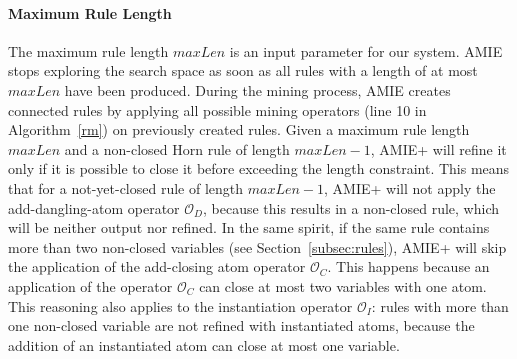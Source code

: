 \paragraph{Maximum Rule Length}
% 
The maximum rule length $maxLen$ is an input parameter for our system. AMIE stops exploring the search space as soon as all rules with 
a length of at most $maxLen$ have been produced.
During the mining process, AMIE creates connected rules by applying all possible mining operators 
(line 10 in Algorithm~\ref{rm}) on previously created rules.
Given a maximum rule length $maxLen$ and a non-closed Horn rule of length $maxLen-1$, AMIE+
will refine it only if it is possible to close it before exceeding the length constraint.
This means that for a not-yet-closed rule of length $maxLen-1$, AMIE+ will not apply 
the add-dangling-atom operator $\mathcal{O}_D$, because this results in a non-closed rule,
which will be neither output nor refined. In the same spirit, if the same rule contains more than
two non-closed variables (see Section~\ref{subsec:rules}), AMIE+ will skip the application of 
the add-closing atom operator $\mathcal{O}_C$. This happens because an application of the operator 
$\mathcal{O}_C$ can close at most two variables with one atom. 
This reasoning also applies to the instantiation operator $\mathcal{O}_I$:
rules with more than one non-closed variable are not refined with instantiated atoms, 
because the addition of an instantiated atom can close at most one variable.

